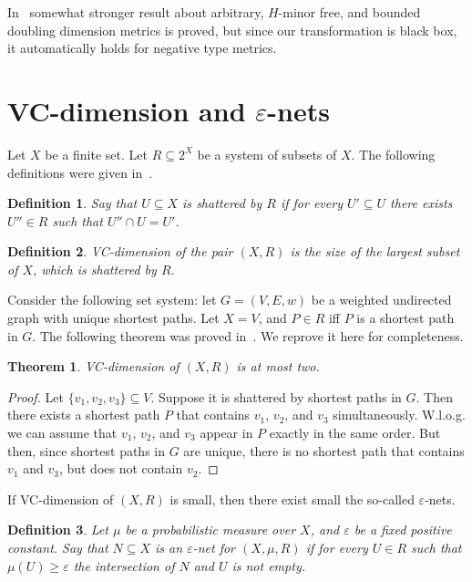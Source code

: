 \documentclass[12pt]{article}
\newcommand{\eps}{\varepsilon}
\newtheorem{definition}{Definition}
\newtheorem{theorem}{Theorem}
\begin{document}
    In~\cite{ABCDGKNS05} somewhat stronger result about arbitrary, $H$-minor free, and bounded doubling dimension metrics is proved, but since our transformation
    is black box, it automatically holds for negative type metrics.
    \section{VC-dimension and $\eps$-nets}

    Let $X$ be a finite set. Let $R \subseteq 2^X$ be a system of subsets of $X$.
    The following definitions were given in~\cite{VC71}.

    \begin{definition}
        Say that $U \subseteq X$ is \emph{shattered} by $R$ if for every $U' \subseteq U$ there exists $U'' \in R$ such that $U'' \cap U = U'$.
    \end{definition}
    \begin{definition}
        \emph{VC-dimension} of the pair $(X, R)$ is the size of the largest subset of $X$, which is shattered by $R$.
    \end{definition}

    Consider the following set system: let $G = (V, E, w)$ be a weighted undirected graph with unique shortest paths.
    Let $X = V$, and $P \in R$ iff $P$ is a shortest path in $G$. The following theorem was proved in~\cite{ADFGW11}. We reprove it here for completeness.

    \begin{theorem}
        \label{vc_shortest}
        VC-dimension of $(X, R)$ is at most two.
    \end{theorem}
    \begin{proof}
        Let $\{v_1, v_2, v_3\} \subseteq V$. Suppose it is shattered by shortest paths in $G$.
        Then there exists a shortest path $P$ that contains $v_1$, $v_2$, and $v_3$ simultaneously.
        W.l.o.g. we can assume that $v_1$, $v_2$, and $v_3$ appear in $P$ exactly in the same order.
        But then, since shortest paths in $G$ are unique, there is no shortest path that contains $v_1$ and $v_3$, but does not contain $v_2$.
    \end{proof}

    If VC-dimension of $(X, R)$ is small, then there exist small the so-called $\eps$-nets.

    \begin{definition}
        Let $\mu$ be a probabilistic measure over $X$, and $\eps$ be a fixed positive constant.
        Say that $N \subseteq X$ is an $\eps$-net for $(X, \mu, R)$ if for every $U \in R$ such that $\mu(U) \geq \eps$ the intersection of $N$ and $U$
        is not empty.
    \end{definition}
\end{document}
